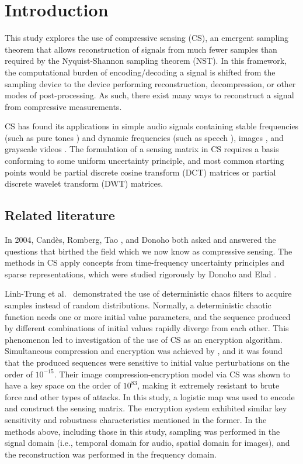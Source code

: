 \chapter{Introduction}
\label{chap:intro}

This study explores the use of compressive sensing (CS), an emergent sampling theorem that allows reconstruction of signals from much fewer samples than required by the Nyquist-Shannon sampling theorem (NST). In this framework, the computational burden of encoding/decoding a signal is shifted from the sampling device to the device performing reconstruction, decompression, or other modes of post-processing. As such, there exist many ways to reconstruct a signal from compressive measurements.

CS has found its applications in simple audio signals containing stable frequencies (such as pure tones \cite{Mathew2016,Andras2018}) and dynamic frequencies (such as speech \cite{Low2013,Low2018,Abrol2015}), images \cite{Mo2013,Zhou2016,Romero2016}, and grayscale videos \cite{Liu2014,Chen2014}. The formulation of a sensing matrix in CS requires a basis conforming to some uniform uncertainty principle, and most common starting points would be partial discrete cosine transform (DCT) matrices or partial discrete wavelet transform (DWT) matrices.


\section{Related literature}
\label{sec:rrl}
In 2004, Cand\`{e}s, Romberg, Tao \cite{Candes2006}, and Donoho \cite{Donoho2006} both asked and answered the questions that birthed the field which we now know as compressive sensing. The methods in CS apply concepts from time-frequency uncertainty principles \cite{Donoho2001} and sparse representations, which were studied rigorously by Donoho and Elad \cite{Donoho2003}.

Linh-Trung et al.~\cite{LinhTrung2008} demonstrated the use of deterministic chaos filters to acquire samples instead of random distributions. Normally, a deterministic chaotic function needs one or more initial value parameters, and the sequence produced by different combinations of initial values rapidly diverge from each other. This phenomenon led to investigation of the use of CS as an encryption algorithm. Simultaneous compression and encryption was achieved by \cite{Zhou2016}, and it was found that the produced sequences were sensitive to initial value perturbations on the order of $10^{-15}$. Their image compression-encryption model via CS was shown to have a key space on the order of $10^{83}$, making it extremely resistant to brute force and other types of attacks. In this study, a logistic map was used to encode and construct the sensing matrix. The encryption system exhibited similar key sensitivity and robustness characteristics mentioned in the former. In the methods above, including those in this study, sampling was performed in the signal domain (i.e., temporal domain for audio, spatial domain for images), and the reconstruction was performed in the frequency domain.

